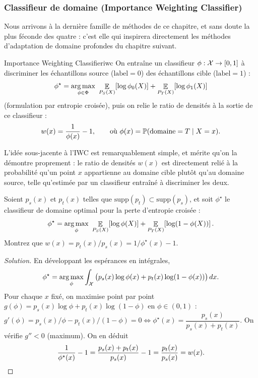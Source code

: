 \documentclass[11pt]{article}
\begin{document}
\subsubsection{Classifieur de domaine (Importance Weighting Classifier)}

Nous arrivons à la dernière famille de méthodes de ce chapitre, et sans doute la plus féconde des
quatre : c'est elle qui inspirera directement les méthodes d'adaptation de domaine profondes du chapitre
suivant.

\begin{definition}{Importance Weighting Classifier}{iwc}
On entraîne un classifieur $\phi:\X\to[0,1]$ à discriminer les échantillons source ($\text{label}=0$) des
échantillons cible ($\text{label}=1$) :
\[
\phi^\star = \argmax_{\phi\in\Phi}\ \Esp{P_S(X)}{\log \phi_0(X)} + \Esp{P_T(X)}{\log \phi_1(X)}
\]
(formulation par entropie croisée), puis on relie le ratio de densités à la sortie de ce classifieur :
\[
w(x) = \frac{1}{\phi(x)} - 1, \qquad \text{où } \phi(x) = \P(\text{domaine}=T\mid X=x).
\]
\end{definition}

L'idée sous-jacente à l'IWC est remarquablement simple, et mérite qu'on la démontre proprement : le ratio
de densités $w(x)$ est directement relié à la probabilité qu'un point $x$ appartienne au domaine cible
plutôt qu'au domaine source, telle qu'estimée par un classifieur entraîné à discriminer les deux.

\begin{exercise}
\label{ex:iwc}
Soient $p_s(x)$ et $p_t(x)$ telles que $\mathrm{supp}(p_t)\subset\mathrm{supp}(p_s)$, et soit $\phi^\star$
le classifieur de domaine optimal pour la perte d'entropie croisée :
\[
\phi^\star = \argmax_{\phi}\ \Esp{P_S(X)}{\log\phi(X)} + \Esp{P_T(X)}{\log(1-\phi(X))}.
\]
Montrez que $w(x) = p_t(x)/p_s(x) = 1/\phi^\star(x) - 1$.
\end{exercise}
\begin{proof}[Solution]
En développant les espérances en intégrales,
\[
\phi^\star = \argmax_\phi \int_\X \big(p_s(x)\log\phi(x) + p_t(x)\log(1-\phi(x))\big)\,dx.
\]
Pour chaque $x$ fixé, on maximise point par point $g(\phi) = p_s(x)\log\phi + p_t(x)\log(1-\phi)$ en
$\phi\in(0,1)$ : $g'(\phi) = p_s(x)/\phi - p_t(x)/(1-\phi) = 0 \iff \phi^\star(x) = \dfrac{p_s(x)}{p_s(x)+
p_t(x)}$. On vérifie $g''<0$ (maximum). On en déduit
\[
\frac{1}{\phi^\star(x)} - 1 = \frac{p_s(x)+p_t(x)}{p_s(x)} - 1 = \frac{p_t(x)}{p_s(x)} = w(x). \qedhere
\]
\end{proof}
\end{document}
